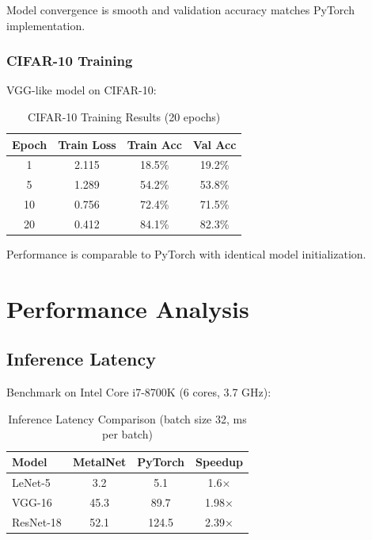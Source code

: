 \documentclass[12pt,oneside,a4paper]{report}
\begin{document}
Model convergence is smooth and validation accuracy matches PyTorch implementation.

\subsubsection{CIFAR-10 Training}

VGG-like model on CIFAR-10:

\begin{table}[H]
\centering
\caption{CIFAR-10 Training Results (20 epochs)}
\begin{tabular}{|c|c|c|c|}
\hline
\textbf{Epoch} & \textbf{Train Loss} & \textbf{Train Acc} & \textbf{Val Acc} \\
\hline
1 & 2.115 & 18.5\% & 19.2\% \\
\hline
5 & 1.289 & 54.2\% & 53.8\% \\
\hline
10 & 0.756 & 72.4\% & 71.5\% \\
\hline
20 & 0.412 & 84.1\% & 82.3\% \\
\hline
\end{tabular}
\end{table}

Performance is comparable to PyTorch with identical model initialization.

\section{Performance Analysis}

\subsection{Inference Latency}

Benchmark on Intel Core i7-8700K (6 cores, 3.7 GHz):

\begin{table}[H]
\centering
\caption{Inference Latency Comparison (batch size 32, ms per batch)}
\begin{tabular}{|l|c|c|c|}
\hline
\textbf{Model} & \textbf{MetalNet} & \textbf{PyTorch} & \textbf{Speedup} \\
\hline
LeNet-5 & 3.2 & 5.1 & 1.6× \\
\hline
VGG-16 & 45.3 & 89.7 & 1.98× \\
\hline
ResNet-18 & 52.1 & 124.5 & 2.39× \\
\hline
\end{tabular}
\end{table}
\end{document}

